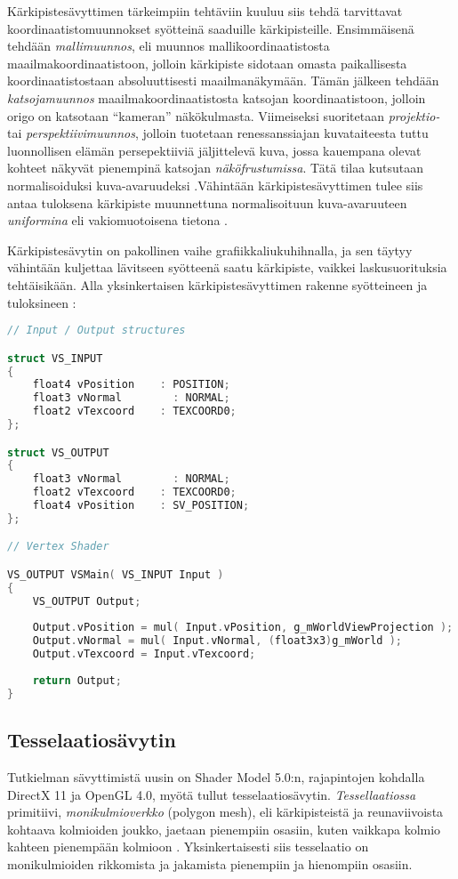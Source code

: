 \documentclass[finnish]{tktltiki2}
\theoremstyle{definition}
\theoremstyle{remark}
\begin{document}
Kärkipistesävyttimen tärkeimpiin tehtäviin kuuluu siis tehdä tarvittavat koordinaatistomuunnokset syötteinä saaduille kärkipisteille. Ensimmäisenä tehdään \emph{mallimuunnos}, eli muunnos mallikoordinaatistosta maailmakoordinaatistoon, jolloin kärkipiste sidotaan omasta paikallisesta koordinaatistostaan absoluuttisesti maailmanäkymään. Tämän jälkeen tehdään \emph{katsojamuunnos} maailmakoordinaatistosta katsojan koordinaatistoon, jolloin origo on katsotaan ``kameran'' näkökulmasta. Viimeiseksi suoritetaan \emph{projektio-} tai \emph{perspektiivimuunnos}, jolloin tuotetaan renessanssiajan kuvataiteesta tuttu luonnollisen elämän persepektiiviä jäljittelevä kuva, jossa kauempana olevat kohteet näkyvät pienempinä katsojan \emph{näköfrustumissa}. Tätä tilaa kutsutaan normalisoiduksi kuva-avaruudeksi \cite{Puh08}.Vähintään kärkipistesävyttimen tulee siis antaa tuloksena kärkipiste muunnettuna normalisoituun kuva-avaruuteen \emph{uniformina} eli vakiomuotoisena tietona \cite{Puh08}.

Kärkipistesävytin on pakollinen vaihe grafiikkaliukuhihnalla, ja sen täytyy vähintään kuljettaa lävitseen syötteenä saatu kärkipiste, vaikkei laskusuorituksia tehtäisikään. Alla yksinkertaisen kärkipistesävyttimen rakenne syötteineen ja tuloksineen \cite{Mic11}:
\lstset{breaklines=true}
\begin{lstlisting}[language=c]
// Input / Output structures

struct VS_INPUT
{
    float4 vPosition    : POSITION;
    float3 vNormal        : NORMAL;
    float2 vTexcoord    : TEXCOORD0;
};

struct VS_OUTPUT
{
    float3 vNormal        : NORMAL;
    float2 vTexcoord    : TEXCOORD0;
    float4 vPosition    : SV_POSITION;
};

// Vertex Shader

VS_OUTPUT VSMain( VS_INPUT Input )
{
    VS_OUTPUT Output;
    
    Output.vPosition = mul( Input.vPosition, g_mWorldViewProjection );
    Output.vNormal = mul( Input.vNormal, (float3x3)g_mWorld );
    Output.vTexcoord = Input.vTexcoord;
    
    return Output;
}
\end{lstlisting}

\subsection{Tesselaatiosävytin}

Tutkielman sävyttimistä uusin on Shader Model 5.0:n, rajapintojen kohdalla DirectX 11 ja OpenGL 4.0, myötä tullut tesselaatiosävytin. \emph{Tessellaatiossa} primitiivi, \emph{monikulmioverkko} (polygon mesh), eli kärkipisteistä ja reunaviivoista kohtaava kolmioiden joukko\cite{Puh08}, jaetaan pienempiin osasiin, kuten vaikkapa kolmio kahteen pienempään kolmioon \cite{Nvi10}. Yksinkertaisesti siis tesselaatio on monikulmioiden rikkomista ja jakamista pienempiin ja hienompiin osasiin. 
\end{document}
